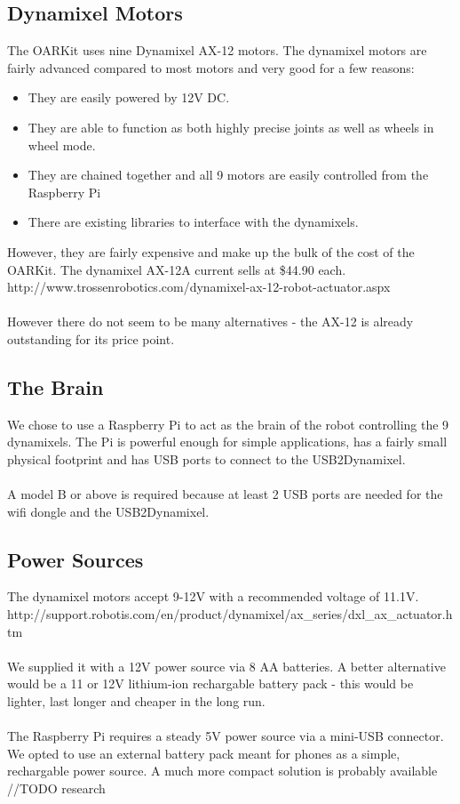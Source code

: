 \documentclass[]{article}
\begin{document}
\subsection{Dynamixel Motors}
The OARKit uses nine Dynamixel AX-12 motors. The dynamixel motors are fairly advanced compared to most motors and very good for a few reasons:
\begin{itemize}
  \item They are easily powered by 12V DC.
  \item They are able to function as both highly precise joints as well as wheels in wheel mode.
  \item They are chained together and all 9 motors are easily controlled from the Raspberry Pi
  \item There are existing libraries to interface with the dynamixels.
\end{itemize}
However, they are fairly expensive and make up the bulk of the cost of the OARKit. The dynamixel AX-12A current sells at \$44.90 each. http://www.trossenrobotics.com/dynamixel-ax-12-robot-actuator.aspx
\\
\\
However there do not seem to be many alternatives - the AX-12 is already outstanding for its price point.

\subsection{The Brain}
We chose to use a Raspberry Pi to act as the brain of the robot controlling the 9 dynamixels. The Pi is powerful enough for simple applications, has a fairly small physical footprint and has USB ports to connect to the USB2Dynamixel.
\\
\\
A model B or above is required because at least 2 USB ports are needed for the wifi dongle and the USB2Dynamixel.

\subsection{Power Sources}
The dynamixel motors accept 9-12V with a recommended voltage of 11.1V. http://support.robotis.com/en/product/dynamixel/ax\_series/dxl\_ax\_actuator.htm
\\
\\
We supplied it with a 12V power source via 8 AA batteries. A better alternative would be a 11 or 12V lithium-ion rechargable battery pack - this would be lighter, last longer and cheaper in the long run.
\\
\\
The Raspberry Pi requires a steady 5V power source via a mini-USB connector. We opted to use an external battery pack meant for phones as a simple, rechargable power source. A much more compact solution is probably available //TODO research
\end{document}
